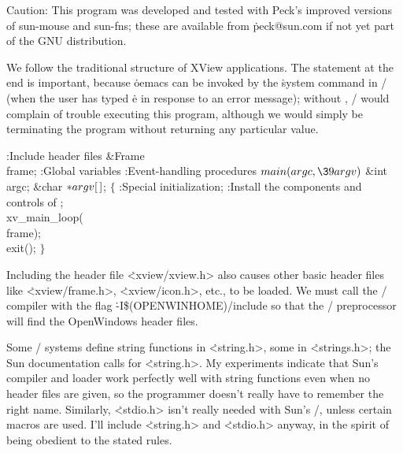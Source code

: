 Caution: This program was developed and tested with Peck's improved
versions of sun-mouse and sun-fns; these are available from
\.{peck@sun.com} if not yet part of the GNU distribution.

\fi

We follow the traditional structure of XView applications. The 
statement at the end is important, because \.{oemacs} can be invoked by
the \.{system} command in \TEX/ (when the user has typed \.e in response
to an error message); without , \TEX/ would complain of
trouble
executing this program, although we would simply be terminating the program
without returning any particular value.

\Y\B{}:Include header files\X\7
\&{Frame} \\{frame};\7
:Global variables\X{}\7
:Event-handling procedures\X\7
${}\\{main}(\\{argc},\39\\{argv}){}$\1\1\6
\&{int} \\{argc};\5
\&{char} ${}{*}\\{argv}[\,]{}$;\2\2\6
${}\{{}$\1\6
:Special initialization\X;\6
:Install the components and controls of \X;\6
\\{xv\_main\_loop}(\\{frame});\6
\\{exit}();\6
\4${}\}{}$\2\par
\fi

Including the header file \.{<xview/xview.h>} also causes other
basic header files like \.{<xview/frame.h>}, \.{<xview/icon.h>}, etc.,
to be loaded. We must call the \CEE/ compiler with the flag
\.{-I\$(OPENWINHOME)/include} so that the \CEE/ preprocessor will
find the OpenWindows header files.

Some \UNIX/ systems define string functions in \.{<string.h>}, some in
\.{<strings.h>}; the Sun documentation calls for \.{<string.h>}. My
experiments indicate that Sun's compiler and loader work perfectly
well with string functions even when no header files are given, so the
programmer doesn't really have to remember the right name. Similarly,
\.{<stdio.h>} isn't really needed with Sun's \CEE/, unless certain macros
are used. I'll include \.{<string.h>} and \.{<stdio.h>} anyway, in the
spirit of being obedient to the stated rules.

